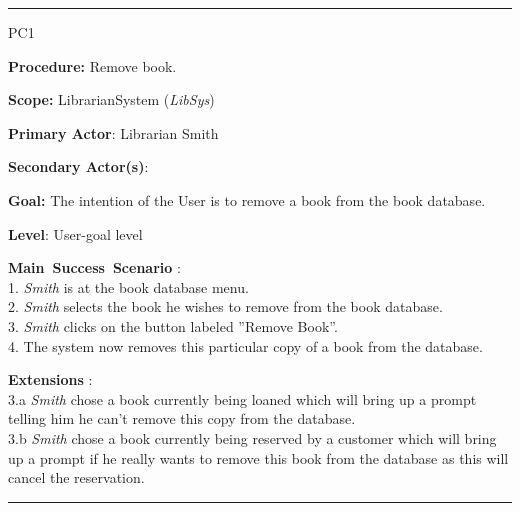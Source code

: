 
\vspace{0.5cm}
\hrule
\begin{lyxlist}{PC1}
\small{
\item [\textbf{Procedure:}] Remove book.
\item [\textbf{Scope:}] LibrarianSystem (\emph{LibSys})
\item [\textbf{Primary Actor}:] Librarian Smith
\item [\textbf{Secondary Actor(s)}:] 
\item [\textbf{Goal:}] The intention of the User is to remove a book from the
book database.
\item [\textbf{Level}:] User-goal level
\item [\textbf{Main~Success~Scenario}]:\\
1. \emph{Smith} is at the book database menu.\\
2. \emph{Smith} selects the book he wishes to remove from the book database.\\
3. \emph{Smith} clicks on the button labeled ''Remove Book''.\\
4. The system now removes this particular copy of a book from the
database.\\


\item [\textbf{Extensions}]:\\
3.a \emph{Smith} chose a book currently being loaned which will bring up a
prompt telling him he can't remove this copy from the database.\\
3.b \emph{Smith} chose a book currently being reserved by a customer which will
bring up a prompt if he really wants to remove this book from the database as
this will cancel the reservation.\\
}

\end{lyxlist}
\hrule

